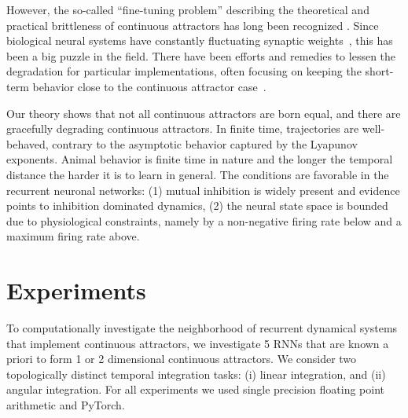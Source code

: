 \documentclass{article} %
\newcounter{ct}
\theoremstyle{definition}
\theoremstyle{remark}
\renewcommand{\cite}{\citep}
\begin{document}
However, the so-called ``fine-tuning problem'' describing the theoretical and practical brittleness of continuous attractors has long been recognized \citep{seung1998,Park2023a}.
Since biological neural systems have constantly fluctuating synaptic weights~\cite{shimizu2021}, this has been a big puzzle in the field.
There have been efforts and remedies to lessen the degradation for particular implementations, often focusing on keeping the short-term behavior close to the continuous attractor case~\cite{Lim2012,Lim2013,Boerlin2013,Koulakov2002,Renart2003}.

Our theory shows that not all continuous attractors are born equal, and there are gracefully degrading continuous attractors.
In finite time, trajectories are well-behaved, contrary to the asymptotic behavior captured by the Lyapunov exponents.
Animal behavior is finite time in nature and the longer the temporal distance the harder it is to learn in general.
The conditions are favorable in the recurrent neuronal networks: (1) mutual inhibition is widely present and evidence points to inhibition dominated dynamics,
(2) the neural state space is bounded due to physiological constraints, namely by a non-negative firing rate below and a maximum firing rate above.


\section{Experiments}
To computationally investigate the neighborhood of recurrent dynamical systems that implement continuous attractors, we investigate 5 RNNs that are known a priori to form 1 or 2 dimensional continuous attractors.
We consider two topologically distinct temporal integration tasks: (i) linear integration, and (ii) angular integration.
For all experiments we used single precision floating point arithmetic and PyTorch.
%
\end{document}
